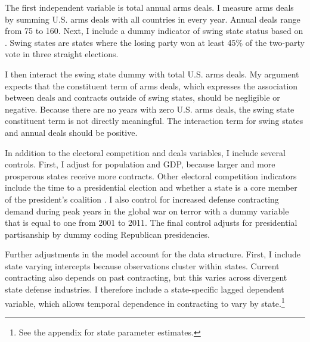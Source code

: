 \documentclass[12pt]{article}
\begin{document}
The first independent variable is total annual arms deals.  
I measure arms deals by summing U.S. arms deals with all countries in every year. 
Annual deals range from 75 to 160. 
Next, I include a dummy indicator of swing state status based on \citet{KrinerReeves2015}.
Swing states are states where the losing party won at least 45\% of the two-party vote in three straight elections. 


I then interact the swing state dummy with total U.S. arms deals. 
My argument expects that the constituent term of arms deals, which expresses the association between deals and contracts outside of swing states, should be negligible or negative.
Because there are no years with zero U.S. arms deals, the swing state constituent term is not directly meaningful.  
The interaction term for swing states and annual deals should be positive.


In addition to the electoral competition and deals variables, I include several controls. 
First, I adjust for population and GDP, because larger and more prosperous states receive more contracts. 
Other electoral competition indicators include the time to a presidential election and whether a state is a core member of the president's coalition \citep{KrinerReeves2015}. 
I also control for increased defense contracting demand during peak years in the global war on terror with a dummy variable that is equal to one from 2001 to 2011. 
The final control adjusts for presidential partisanship by dummy coding Republican presidencies. 


Further adjustments in the model account for the data structure.
First, I include state varying intercepts because observations cluster within states. 
Current contracting also depends on past contracting, but this varies across divergent state defense industries. 
I therefore include a state-specific lagged dependent variable, which allows temporal dependence in contracting to vary by state.\footnote{See the appendix for state parameter estimates.}




\end{document}
